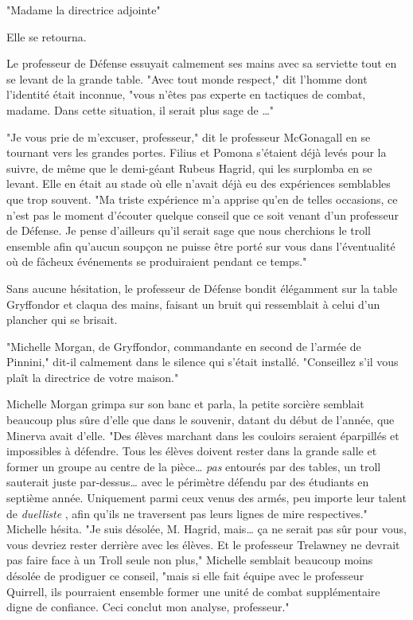 "Madame la directrice adjointe"

Elle se retourna.

Le professeur de Défense essuyait calmement ses mains avec sa serviette tout en se levant de la grande table. "Avec tout monde respect," dit l'homme dont l'identité était inconnue, "vous n'êtes pas experte en tactiques de combat, madame. Dans cette situation, il serait plus sage de …"

"Je vous prie de m'excuser, professeur," dit le professeur McGonagall en se tournant vers les grandes portes. Filius et Pomona s'étaient déjà levés pour la suivre, de même que le demi-géant Rubeus Hagrid, qui les surplomba en se levant. Elle en était au stade où elle n'avait déjà eu des expériences semblables que trop souvent. "Ma triste expérience m'a apprise qu'en de telles occasions, ce n'est pas le moment d'écouter quelque conseil que ce soit venant d'un professeur de Défense. Je pense d'ailleurs qu'il serait sage que nous cherchions le troll ensemble afin qu'aucun soupçon ne puisse être porté sur vous dans l'éventualité où de fâcheux événements se produiraient pendant ce temps."

Sans aucune hésitation, le professeur de Défense bondit élégamment sur la table Gryffondor et claqua des mains, faisant un bruit qui ressemblait à celui d'un plancher qui se brisait.

"Michelle Morgan, de Gryffondor, commandante en second de l'armée de Pinnini," dit-il calmement dans le silence qui s'était installé. "Conseillez s'il vous plaît la directrice de votre maison."

Michelle Morgan grimpa sur son banc et parla, la petite sorcière semblait beaucoup plus sûre d'elle que dans le souvenir, datant du début de l'année, que Minerva avait d'elle. "Des élèves marchant dans les couloirs seraient éparpillés et impossibles à défendre. Tous les élèves doivent rester dans la grande salle et former un groupe au centre de la pièce… \emph{pas}  entourés par des tables, un troll sauterait juste par-dessus… avec le périmètre défendu par des étudiants en septième année. Uniquement parmi ceux venus des armés, peu importe leur talent de \emph{duelliste} , afin qu'ils ne traversent pas leurs lignes de mire respectives." Michelle hésita. "Je suis désolée, M. Hagrid, mais… ça ne serait pas sûr pour vous, vous devriez rester derrière avec les élèves. Et le professeur Trelawney ne devrait pas faire face à un Troll seule non plus," Michelle semblait beaucoup moins désolée de prodiguer ce conseil, "mais si elle fait équipe avec le professeur Quirrell, ils pourraient ensemble former une unité de combat supplémentaire digne de confiance. Ceci conclut mon analyse, professeur."

